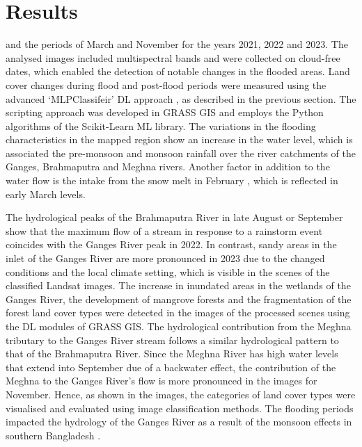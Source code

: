 \documentclass[water,article,accept,pdftex,oneauhor]{Definitions/mdpi}
\begin{document}
\section{Results}

 and the periods of March and November for the years 2021, 2022 and 2023. {The }analysed images included multispectral bands and were collected on cloud-free dates, which enabled the detection of notable changes in the flooded areas. Land cover changes during flood and post-flood periods were measured using the advanced `MLPClassifeir' DL approach {, as described in the previous section. The scripting approach was }developed {in} GRASS GIS and employs the Python algorithms of the Scikit-Learn ML library. The variations in the flooding characteristics in the mapped region show an increase in the water level, which is associated the pre-monsoon and monsoon rainfall over the river catchments of the Ganges, Brahmaputra and Meghna rivers. Another factor in addition to the water flow is the intake from the snow melt in February%
, which is reflected in early March levels. 

The hydrological peaks of the Brahmaputra River in late August or September show that the maximum flow of a stream in response to a rainstorm event coincides with the Ganges River peak in 2022. In contrast, sandy areas in the inlet of the Ganges River are more pronounced in 2023 due to the changed conditions and the local climate setting, which is visible in the scenes of {the classified }Landsat {images}. The increase in inundated areas in the wetlands of the Ganges River, the development of mangrove forests and the fragmentation of the forest land cover types were detected in the images of the processed scenes {using the} DL modules of GRASS GIS. The hydrological contribution from the Meghna tributary to the Ganges River stream follows a similar hydrological pattern to that of the Brahmaputra River. Since the Meghna River has high water levels that extend into September due of a backwater %
effect, the contribution of the Meghna to the Ganges River's flow is more pronounced in the images for November. Hence, as shown in the images, the categories of land cover types were visualised and evaluated using image classification methods. The flooding periods impacted the hydrology of the Ganges River as a result of the monsoon effects in southern Bangladesh%
.
\end{document}
